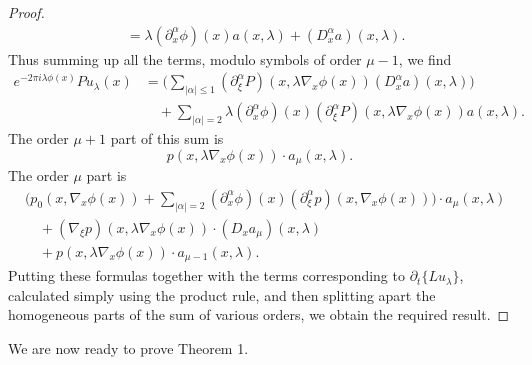 \documentclass{article}
\theoremstyle{plain}
\theoremstyle{remark}
\theoremstyle{definition}
\begin{document}
\begin{proof}
\begin{align*}
		&= \lambda (\partial^\alpha_x \phi)(x) a(x,\lambda) + (D^\alpha_x a)(x,\lambda).
	\end{align*}
	Thus summing up all the terms, modulo symbols of order $\mu - 1$, we find
	\begin{align*}
		e^{-2 \pi i \lambda \phi(x)} Pu_\lambda(x) &= \Bigg( \sum_{|\alpha| \leq 1} (\partial_\xi^\alpha P)(x,\lambda \nabla_x \phi(x)) (D^\alpha_x a)(x,\lambda) \Bigg)\\
		&\quad + \sum_{|\alpha| = 2} \lambda (\partial^\alpha_x \phi)(x) (\partial_\xi^\alpha P)(x, \lambda \nabla_x \phi(x)) a(x,\lambda).
	\end{align*}
	The order $\mu + 1$ part of this sum is
	\[ p(x, \lambda \nabla_x \phi(x)) \cdot a_\mu(x,\lambda). \]
	The order $\mu$ part is
	\begin{align*}
		& \Big( p_0(x, \nabla_x \phi(x)) + \sum_{|\alpha| = 2} (\partial^\alpha_x \phi)(x) (\partial_\xi^\alpha p)(x, \nabla_x \phi(x)) \Big) \cdot a_\mu(x,\lambda)\\
		&\quad + (\nabla_\xi p)(x,\lambda \nabla_x \phi(x)) \cdot (D_x a_\mu)(x,\lambda) \\
		&\quad + p(x,\lambda \nabla_x \phi(x)) \cdot a_{\mu - 1}(x,\lambda).
	\end{align*}
	Putting these formulas together with the terms corresponding to $\partial_t \{ L u_\lambda \}$, calculated simply using the product rule, and then splitting apart the homogeneous parts of the sum of various orders, we obtain the required result.
\end{proof}

We are now ready to prove Theorem 1.
\end{document}
